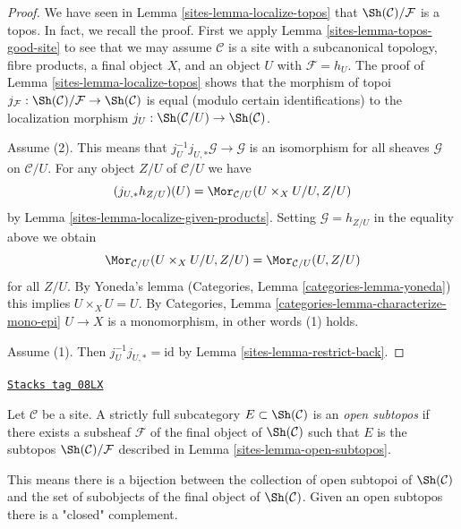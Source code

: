 \begin{proof}

We have seen in Lemma \ref{sites-lemma-localize-topos} that
$\Sh(\mathcal{C})/\mathcal{F}$ is a topos. In fact, we recall the
proof. First we apply Lemma \ref{sites-lemma-topos-good-site}
to see that we may assume $\mathcal{C}$ is a site with a subcanonical
topology, fibre products, a final object $X$, and an object $U$ with
$\mathcal{F} = h_U$. The proof of
Lemma \ref{sites-lemma-localize-topos}
shows that the morphism of topoi
$j_\mathcal{F} : \Sh(\mathcal{C})/\mathcal{F} \to \Sh(\mathcal{C})$
is equal (modulo certain identifications) to the localization morphism
$j_U : \Sh(\mathcal{C}/U) \to \Sh(\mathcal{C})$.

\medskip\noindent
Assume (2). This means that $j_U^{-1}j_{U, *}\mathcal{G} \to \mathcal{G}$
is an isomorphism for all sheaves $\mathcal{G}$ on $\mathcal{C}/U$.
For any object $Z/U$ of $\mathcal{C}/U$ we have
$$
(j_{U, *}h_{Z/U})(U) = \Mor_{\mathcal{C}/U}(U \times_X U/U, Z/U)
$$
by Lemma \ref{sites-lemma-localize-given-products}.
Setting $\mathcal{G} = h_{Z/U}$ in the equality above we obtain
$$
\Mor_{\mathcal{C}/U}(U \times_X U/U, Z/U) = \Mor_{\mathcal{C}/U}(U, Z/U)
$$
for all $Z/U$. By Yoneda's lemma
(Categories, Lemma \ref{categories-lemma-yoneda})
this implies $U \times_X U = U$. By
Categories, Lemma \ref{categories-lemma-characterize-mono-epi}
$U \to X$ is a monomorphism, in other words (1) holds.

\medskip\noindent
Assume (1). Then $j_U^{-1} j_{U, *} = \text{id}$ by
Lemma \ref{sites-lemma-restrict-back}.
\end{proof}

\begin{definition}
\label{sites-definition-open-subtopos}
\href{https://stacks.math.columbia.edu/tag/08LX}{\texttt{Stacks tag 08LX}}

Let $\mathcal{C}$ be a site. A strictly full subcategory
$E \subset \Sh(\mathcal{C})$ is an {\it open subtopos}
if there exists a subsheaf $\mathcal{F}$ of the final object
of $\Sh(\mathcal{C})$ such that $E$ is the subtopos
$\Sh(\mathcal{C})/\mathcal{F}$ described in Lemma \ref{sites-lemma-open-subtopos}.
\end{definition}

This means there is a bijection between the collection of open subtopoi
of $\Sh(\mathcal{C})$ and the set of subobjects of the final object of
$\Sh(\mathcal{C})$. Given an open subtopos there is a "closed" complement.

